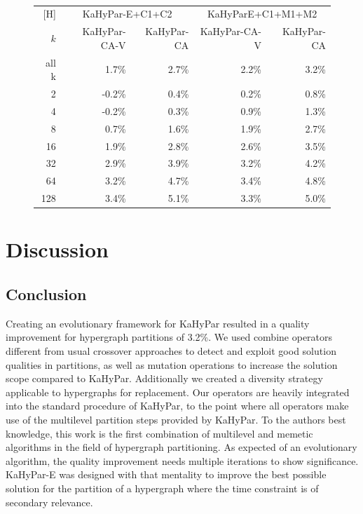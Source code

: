 \documentclass[a4paper,12pt,titlepage, BCOR7mm,headsepline]{scrbook}
\numberwithin{equation}{section}
\begin{document}
\begin{figure}[t]


\centering
\vspace{0pt}
~\label{tbl:imp}
\begin{tabular}{r||r|r||r|r}[H]
&\multicolumn{2}{c||}{KaHyPar-E+C1+C2} & \multicolumn{2}{c}{KaHyParE+C1+M1+M2} \\
$k$                     &                              KaHyPar-CA-V    & KaHyPar-CA &  KaHyPar-CA-V   & KaHyPar-CA  \\ 
                     \hline
                     \hline

all k &  1.7\% & 2.7\% & 2.2\% & 3.2\% \\
\hline
2&-0.2\% & 0.4\% & 0.2\% & 0.8\% \\
4& -0.2\% &0.3\% &0.9\% &1.3\%\\
8& 0.7\% &1.6\%& 1.9\% &2.7\%\\
16& 1.9\% &2.8\%& 2.6\%& 3.5\%\\
32& 2.9\% &3.9\%& 3.2\%& 4.2\%\\
64&  3.2\% &4.7\%& 3.4\% &4.8\%\\
128& 3.4\% &5.1\%& 3.3\% &5.0\%  
\end{tabular}

\end{figure}








\chapter{Discussion}
\section{Conclusion}
Creating an evolutionary framework for KaHyPar resulted in a quality improvement for hypergraph partitions of 3.2\%. We used combine operators different from usual crossover approaches to detect and exploit good solution qualities in partitions, as well as mutation operations to increase the solution scope compared to KaHyPar. Additionally we created a diversity strategy applicable to hypergraphs for replacement. Our operators are heavily integrated into the standard procedure of KaHyPar, to the point where all operators make use of the multilevel partition steps provided by KaHyPar. To the authors best knowledge, this work is the first combination of multilevel and memetic algorithms in the field of hypergraph partitioning.
As expected of an evolutionary algorithm, the quality improvement needs multiple iterations to show significance. KaHyPar-E was designed with that mentality to improve the best possible solution for the partition of a hypergraph where the time constraint is of secondary relevance. 
\end{document}
